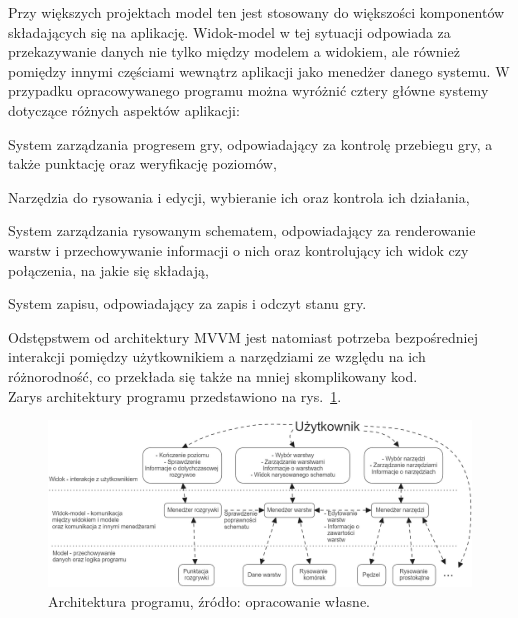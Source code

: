 Przy większych projektach model ten jest stosowany do większości komponentów składających się na aplikację.
Widok-model w tej sytuacji odpowiada za przekazywanie danych nie tylko między modelem a widokiem,
ale również pomiędzy innymi częściami wewnątrz aplikacji jako menedżer danego systemu.
W przypadku opracowywanego programu można wyróżnić cztery główne systemy dotyczące różnych aspektów aplikacji:

\begin{citemize}
    \item System zarządzania progresem gry, odpowiadający za kontrolę przebiegu gry,\linebreak
    a także punktację oraz weryfikację poziomów,
    \item Narzędzia do rysowania i edycji, wybieranie ich oraz kontrola ich działania,
    \item System zarządzania rysowanym schematem,
    odpowiadający za renderowanie warstw i przechowywanie informacji o nich
    oraz kontrolujący ich widok czy połączenia, na jakie się składają,
    \item System zapisu, odpowiadający za zapis i odczyt stanu gry.
\end{citemize}

Odstępstwem od architektury MVVM jest natomiast potrzeba bezpośredniej interakcji pomiędzy użytkownikiem
a narzędziami ze względu na ich różnorodność, co przekłada się także na mniej skomplikowany kod.\\
Zarys architektury programu przedstawiono na rys.~\ref{fig:architektura}.

\begin{figure}[h!]
    \centering
    \includegraphics[width=\textwidth]{chapters/chapter3/rys/arch}
    \caption[Architektura programu.]{Architektura programu, źródło: opracowanie własne.}
    \label{fig:architektura}
\end{figure}

